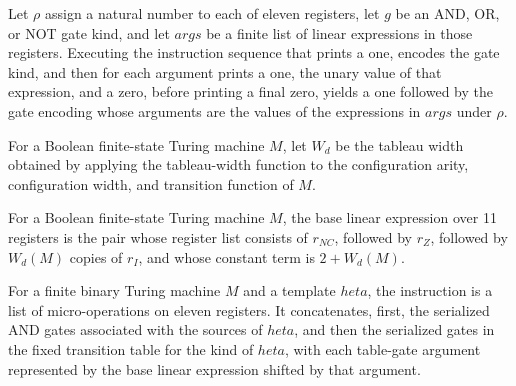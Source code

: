\begin{theorem}
\label{Complexity.UTab.flatMap_exec_sgOps}
\leanok
{}
Let $\rho$ assign a natural number to each of eleven registers, let $g$ be an AND, OR,
or NOT gate kind, and let $args$ be a finite list of linear expressions in those
registers. Executing the instruction sequence that prints a one, encodes the gate kind,
and then for each argument prints a one, the unary value of that expression, and a zero,
before printing a final zero, yields a one followed by the gate encoding whose arguments
are the values of the expressions in $args$ under $\rho$.
\end{theorem}

\begin{definition}
\label{Complexity.UTab.Wd}
\leanok
{}
For a Boolean finite-state Turing machine $M$, let $W_d$ be the tableau width obtained
by applying the tableau-width function to the configuration arity, configuration width,
and transition function of $M$.
\end{definition}

\begin{definition}
\label{Complexity.UTab.baseE}
\leanok
{}
For a Boolean finite-state Turing machine $M$, the base linear expression over 11
registers is the pair whose register list consists of $r_{NC}$, followed by $r_Z$,
followed by $W_d(M)$ copies of $r_I$, and whose constant term is $2+W_d(M)$.
\end{definition}

\begin{definition}
\label{Complexity.UTab.instrOps}
\leanok
{}
For a finite binary Turing machine $M$ and a template $	heta$, the instruction is a list
of micro-operations on eleven registers. It concatenates, first, the serialized AND
gates associated with the sources of $	heta$, and then the serialized gates in the fixed
transition table for the kind of $	heta$, with each table-gate argument represented by
the base linear expression shifted by that argument.
\end{definition}

